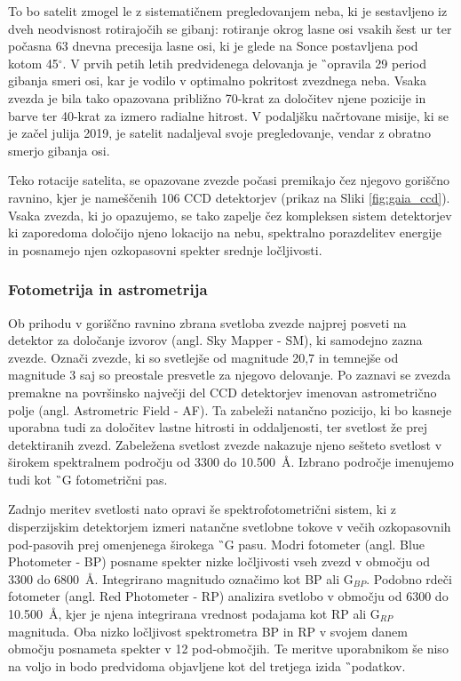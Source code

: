 To bo satelit zmogel le z sistematičnem pregledovanjem neba, ki je sestavljeno iz dveh neodvisnost rotirajočih se gibanj: rotiranje okrog lasne osi vsakih šest ur ter počasna 63 dnevna precesija lasne osi, ki je glede na Sonce postavljena pod kotom 45$^\circ$. V prvih petih letih predvidenega delovanja je \G\ opravila 29 period gibanja smeri osi, kar je vodilo v optimalno pokritost zvezdnega neba. Vsaka zvezda je bila tako opazovana približno 70-krat za določitev njene pozicije in barve ter 40-krat za izmero radialne hitrost. V podaljšku načrtovane misije, ki se je začel julija 2019, je satelit nadaljeval svoje pregledovanje, vendar z obratno smerjo gibanja osi.

Teko rotacije satelita, se opazovane zvezde počasi premikajo čez njegovo goriščno ravnino, kjer je nameščenih 106 CCD detektorjev (prikaz na Sliki \ref{fig:gaia_ccd}). Vsaka zvezda, ki jo opazujemo, se tako zapelje čez kompleksen sistem detektorjev ki zaporedoma določijo njeno lokacijo na nebu, spektralno porazdelitev energije in posnamejo njen ozkopasovni spekter srednje ločljivosti.

\subsubsection{Fotometrija in astrometrija}
Ob prihodu v goriščno ravnino zbrana svetloba zvezde najprej posveti na detektor za določanje izvorov (angl. Sky Mapper - SM), ki samodejno zazna zvezde. Označi zvezde, ki so svetlejše od magnitude 20,7 in temnejše od magnitude 3 saj so preostale presvetle za njegovo delovanje. Po zaznavi se zvezda premakne na površinsko največji del CCD detektorjev imenovan astrometrično polje (angl. Astrometric Field - AF). Ta zabeleži natančno pozicijo, ki bo kasneje uporabna tudi za določitev lastne hitrosti in oddaljenosti, ter svetlost že prej detektiranih zvezd. Zabeležena svetlost zvezde nakazuje njeno sešteto svetlost v širokem spektralnem področju od 3300 do 10.500~\AA. Izbrano področje imenujemo tudi kot \G\ G fotometrični pas.

Zadnjo meritev svetlosti nato opravi še spektrofotometrični sistem, ki z disperzijskim detektorjem izmeri natančne svetlobne tokove v večih ozkopasovnih pod-pasovih prej omenjenega širokega \G\ G pasu. Modri fotometer (angl. Blue Photometer - BP) posname spekter nizke ločljivosti vseh zvezd v območju od 3300 do 6800~\AA. Integrirano magnitudo označimo kot BP ali G$_{BP}$. Podobno rdeči fotometer (angl. Red Photometer - RP) analizira svetlobo v območju od 6300 do 10.500~\AA, kjer je njena integrirana vrednost podajama kot RP ali G$_{RP}$ magnituda. Oba nizko ločljivost spektrometra BP in RP v svojem danem območju posnameta spekter v 12 pod-območjih. Te meritve uporabnikom še niso na voljo in bodo predvidoma objavljene kot del tretjega izida \G\ podatkov.

